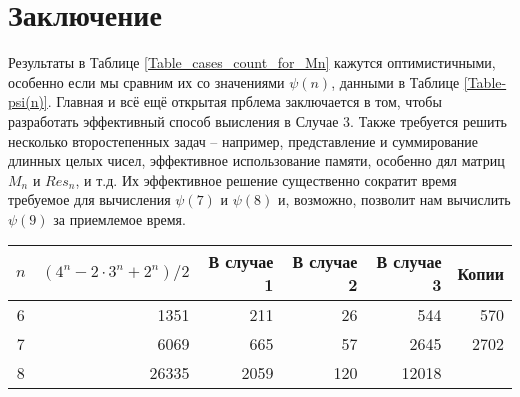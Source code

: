 \chapter{Заключение}
Результаты в Таблице \ref{Table_cases_count_for_Mn} кажутся оптимистичными, 
особенно если мы сравним их со значениями $\psi(n)$, данными в
Таблице \ref{Table-psi(n)}. Главная и всё ещё открытая прблема заключается в том,
чтобы разработать эффективный способ выисления в Случае 3. Также требуется решить
несколько второстепенных задач -- например, представление и суммирование длинных целых
чисел, эффективное использование памяти, особенно дял матриц $M_n$ и $Res_n$, и т.д.
Их эффективное решение существенно сократит время требуемое для вычисления $\psi(7)$ и 
$\psi(8)$ и, возможно, позволит нам вычислить $\psi(9)$ за приемлемое время.

\begin{center}
 \begin{tabular}{ c | r | r | r | r | r}
  $n$ & $(4^n - 2 \cdot 3^n + 2^n)/2$ & В случае 1 & В случае 2 & В случае 3 & Копии\\
  \hline
  6 & 	1351	& 211	& 26	& 544	& 	570	\T  \\
  7 & 	6069	& 665	& 57	& 2645	& 	2702	\\
  8 & 	26335	& 2059	& 120	& 12018	& \B	12138	\\
  \hline
  \end{tabular}
\end{center}